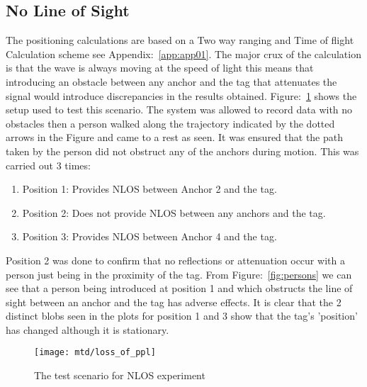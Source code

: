 \subsection{No Line of Sight}\label{subsec:no-line-of-sight}
The positioning calculations are based on a Two way ranging and Time of flight Calculation scheme see Appendix:~\ref{app:app01}.
The major crux of the calculation is that the wave is always moving at the speed of light this means that introducing an obstacle between any anchor and the tag that attenuates the signal would introduce discrepancies in the results obtained.
Figure:~\ref{fig:nlos} shows the setup used to test this scenario.
The system was allowed to record data with no obstacles then a person walked along the trajectory indicated by the dotted arrows in the Figure and came to a rest as seen.
It was ensured that the path taken by the person did not obstruct any of the anchors during motion.
This was carried out 3 times:
\begin{enumerate}
    \item Position 1: Provides NLOS between Anchor 2 and the tag.
    \item Position 2: Does not provide NLOS between any anchors and the tag.
    \item Position 3: Provides NLOS between Anchor 4 and the tag.
\end{enumerate}
Position 2 was done to confirm that no reflections or attenuation occur with a person just being in the proximity of the tag.
From Figure:~\ref{fig:persons} we can see that a person being introduced at position 1 and which obstructs the line of sight between an anchor and the tag has adverse effects.
It is clear that the 2 distinct blobs seen in the plots for position 1 and 3 show that the tag's 'position' has changed although it is stationary.

\begin{figure}[h!]
    \centering
    \texttt{[image: mtd/loss\_of\_ppl]}
    \caption{The test scenario for NLOS experiment}
    \label{fig:nlos}
\end{figure}

